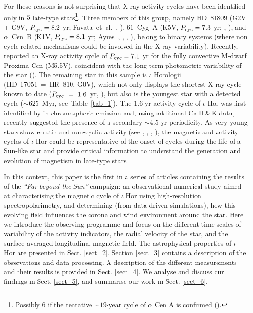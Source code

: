 \documentclass[a4paper,fleqn,usenatbib]{mnras}
\begin{document}
For these reasons is not surprising that X-ray activity cycles have been identified only in $5$ late-type stars\footnote[2]{Possibly $6$ if the tentative $\sim$$19$-year cycle of $\alpha$ Cen A is confirmed ().}. Three members of this group, namely HD~81809 (G2V + G9V, $P_{\rm cyc} = 8.2$ yr; Favata~et~al.~, ), $61$~Cyg~A (K5V, $P_{\rm cyc} = 7.3$ yr; , ), and $\alpha$~Cen~B (K1V, $P_{\rm cyc} = 8.1$ yr; Ayres~, , , ), belong to binary systems (where non cycle-related mechanisms could be involved in the X-ray variability). Recently,  reported an X-ray activity cycle of $P_{\rm cyc} = 7.1$ yr for the fully convective M-dwarf Proxima Cen (M5.5V), coincident with the long-term photometric variability of the star (). The remaining star in this sample is $\iota$ Horologii (HD~17051~=~HR~810, G0V), which not only displays the shortest X-ray cycle known to date ($P_{\rm cyc}~=~1.6$~yr, ), but also is the youngest star with a detected cycle ($\sim$$625$~Myr, see~Table~\ref{tab_1}). The $1.6$-yr activity cycle of $\iota$ Hor was first identified by  in chromospheric emission and, using additional Ca H\,\&\,K data,  recently suggested the presence of a secondary $\sim$$4.5$-yr periodicity. As very young stars show erratic and non-cyclic activity (see , , , ), the magnetic and activity cycles of $\iota$ Hor could be representative of the onset of cycles during the life of a Sun-like star and provide critical information to understand the generation and evolution of magnetism in late-type stars. 

In this context, this paper is the first in a series of articles containing the results of the \textit{``Far beyond the Sun''} campaign: an observational-numerical study aimed at characterising the magnetic cycle of $\iota$ Hor using high-resolution spectropolarimetry, and determining (from data-driven simulations), how this evolving field influences the corona and wind environment around the star. Here we introduce the observing programme and focus on the different time-scales of variability of the activity indicators, the radial velocity of the star, and the surface-averaged longitudinal magnetic field. The astrophysical properties of $\iota$ Hor are presented in Sect. \ref{sect_2}. Section \ref{sect_3} contains a description of the observations and data processing. A description of the different measurements and their results is provided in Sect. \ref{sect_4}. We analyse and discuss our findings in Sect. \ref{sect_5}, and summarise our work in Sect. \ref{sect_6}.
\end{document}

